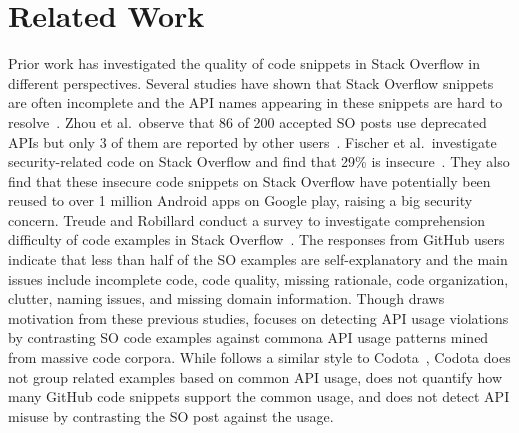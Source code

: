 \section{Related Work} 
Prior work has investigated the quality of code snippets in Stack Overflow in different perspectives. Several studies have shown that Stack Overflow snippets are often incomplete and the API names appearing in these snippets are hard to resolve~\cite{dagenais2012recovering, subramanian2014live, yang2016query}. Zhou et al.~observe that 86 of 200 accepted SO posts use deprecated APIs but only 3 of them are reported by other users~\cite{zhou2016api}. Fischer et al.~investigate security-related code on Stack Overflow and find that 29\% is insecure~\cite{fischer2017stack}. They also find that these insecure code snippets on Stack Overflow have potentially been reused to over 1 million Android apps on Google play, raising a big security concern. Treude and Robillard conduct a survey to investigate comprehension difficulty of code examples in Stack Overflow~\cite{treude2017understanding}. The responses from GitHub users indicate that less than half of the SO examples are self-explanatory and the main issues include incomplete code, code quality, missing rationale, code organization, clutter, naming issues, and missing domain information. Though {\tool} draws motivation from these previous studies, {\tool} focuses on detecting API usage violations by contrasting SO code examples against commona API usage patterns mined from massive code corpora. While {\tool} follows a similar style to Codota~\cite{codota}, Codota does not group related examples based on common API usage, does not quantify how many GitHub code snippets support the common usage, and does not detect API misuse by contrasting the SO post against the usage.


